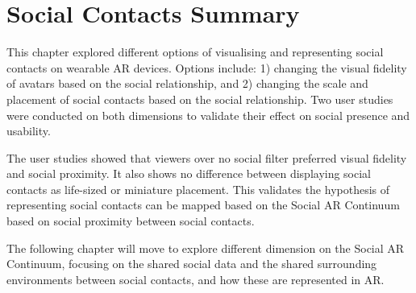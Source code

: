 \section{Social Contacts Summary}

This chapter explored different options of visualising and representing social contacts on wearable AR devices. Options include: 1) changing the visual fidelity of avatars based on the social relationship, and 2) changing the scale and placement of social contacts based on the social relationship. Two user studies were conducted on both dimensions to validate their effect on social presence and usability. 

The user studies showed that viewers over no social filter preferred visual fidelity and social proximity. It also shows no difference between displaying social contacts as life-sized or miniature placement. This validates the hypothesis of representing social contacts can be mapped based on the Social AR Continuum based on social proximity between social contacts. 

The following chapter will move to explore different dimension on the Social AR Continuum, focusing on the shared social data and the shared surrounding environments between social contacts, and how these are represented in AR. 


